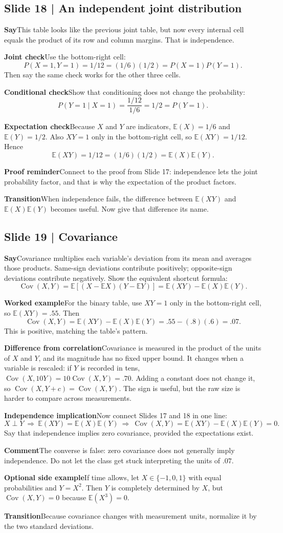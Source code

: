 \documentclass[11pt,a4paper]{article}
\newcommand{\slideheading}[1]{\subsection*{\color{accent}#1}}
\newcommand{\cue}[2]{\par\noindent\textbf{#1}\quad #2\par}
\newcommand{\E}{\mathbb{E}}
\newcommand{\Cov}{\operatorname{Cov}}
\begin{document}
\slideheading{Slide 18 | An independent joint distribution}
\cue{Say}{This table looks like the previous joint table, but now every internal cell equals the product of its row and column margins. That is independence.}
\cue{Joint check}{Use the bottom-right cell: \[P(X=1,Y=1)=1/12=(1/6)(1/2)=P(X=1)P(Y=1).\] Then say the same check works for the other three cells.}
\cue{Conditional check}{Show that conditioning does not change the probability: \[P(Y=1\mid X=1)=\frac{1/12}{1/6}=1/2=P(Y=1).\]}
\cue{Expectation check}{Because $X$ and $Y$ are indicators, $\E(X)=1/6$ and $\E(Y)=1/2$. Also $XY=1$ only in the bottom-right cell, so $\E(XY)=1/12$. Hence \[\E(XY)=1/12=(1/6)(1/2)=\E(X)\E(Y).\]}
\cue{Proof reminder}{Connect to the proof from Slide 17: independence lets the joint probability factor, and that is why the expectation of the product factors.}
\cue{Transition}{When independence fails, the difference between $\E(XY)$ and $\E(X)\E(Y)$ becomes useful. Now give that difference its name.}

\slideheading{Slide 19 | Covariance}
\cue{Say}{Covariance multiplies each variable's deviation from its mean and averages those products. Same-sign deviations contribute positively; opposite-sign deviations contribute negatively. Show the equivalent shortcut formula: \[\Cov(X,Y)=\E[(X-\E X)(Y-\E Y)]=\E(XY)-\E(X)\E(Y).\]}
\cue{Worked example}{For the binary table, use $XY=1$ only in the bottom-right cell, so $\E(XY)=.55$. Then \[\Cov(X,Y)=\E(XY)-\E(X)\E(Y)=.55-(.8)(.6)=.07.\] This is positive, matching the table's pattern.}
\cue{Difference from correlation}{Covariance is measured in the product of the units of $X$ and $Y$, and its magnitude has no fixed upper bound. It changes when a variable is rescaled: if $Y$ is recorded in tens, $\Cov(X,10Y)=10\Cov(X,Y)=.70$. Adding a constant does not change it, so $\Cov(X,Y+c)=\Cov(X,Y)$. The sign is useful, but the raw size is harder to compare across measurements.}
\cue{Independence implication}{Now connect Slides 17 and 18 in one line: \[X\perp Y\ \Rightarrow\ \E(XY)=\E(X)\E(Y)\ \Rightarrow\ \Cov(X,Y)=\E(XY)-\E(X)\E(Y)=0.\] Say that independence implies zero covariance, provided the expectations exist.}
\cue{Comment}{The converse is false: zero covariance does not generally imply independence. Do not let the class get stuck interpreting the units of $.07$.}
\cue{Optional side example}{If time allows, let $X\in\{-1,0,1\}$ with equal probabilities and $Y=X^2$. Then $Y$ is completely determined by $X$, but $\Cov(X,Y)=0$ because $\E(X^3)=0$.}
\cue{Transition}{Because covariance changes with measurement units, normalize it by the two standard deviations.}
\end{document}
